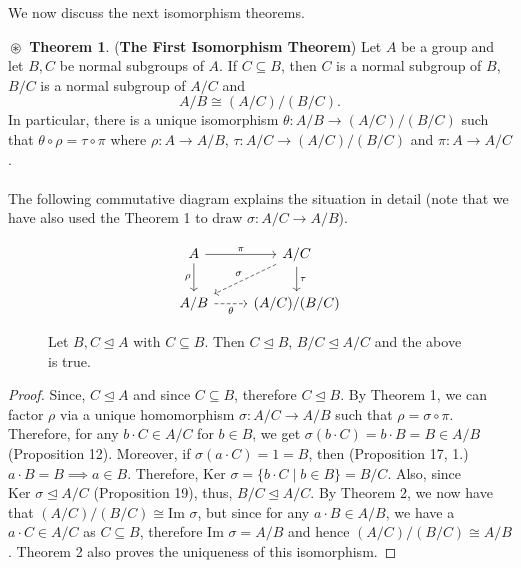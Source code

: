 \documentclass{article}
\theoremstyle{definition}
\newtheorem{theorem}{$\boxed{\boxed{\circledast}}$ Theorem}
\theoremstyle{remark}
\theoremstyle{definition}
\theoremstyle{definition}
\theoremstyle{definition}
\theoremstyle{proof}
\newcommand{\image}[0]{\text{Im }}
\newcommand{\kernel}[0]{\text{Ker }}
\newcommand{\nsg}[0]{\trianglelefteq}
\newcommand{\isomorph}{\cong}
\begin{document}
We now discuss the next isomorphism theorems.
\begin{theorem}
	(\textbf{The First Isomorphism Theorem}) Let $ A $ be a group and let $ B,C $ be normal subgroups of $ A $. If $ C\subseteq B $, then $ C $ is a normal subgroup of $ B $, $ B/C $ is a normal subgroup of $ A/C $ and
	\[A/B \isomorph (A/C)/(B/C).\]
	In particular, there is a unique isomorphism $ \theta : A/B \to (A/C)/(B/C) $ such that $ \theta \circ \rho = \tau \circ \pi $ where $ \rho : A \to A/B $, $ \tau : A/C \to (A/C)/(B/C) $ and $ \pi : A\to A/C $. \\\\
	The following commutative diagram explains the situation in detail (note that we have also used the Theorem 1 to draw $ \sigma : A/C \to A/B$).
	\begin{figure}[h!]
			\[\begin{tikzcd}
			A \arrow{r}{\pi} \arrow[swap]{d}{\rho}&A/C \arrow[swap,dashed]{dl}{\sigma} \arrow{d}{\tau}\\
			A/B \arrow[swap,dashed]{r}{\theta} &(A/C)/(B/C)
		\end{tikzcd}\]
	\caption{Let $ B,C \nsg A $ with $ C\subseteq B $. Then $ C\nsg B $, $ B/C \nsg A/C $ and the above is true.}
	\end{figure}
\end{theorem}
\begin{proof}
	Since, $ C\nsg A $ and since $ C \subseteq B $, therefore $ C\nsg B $. By Theorem 1, we can factor $ \rho $ via a unique homomorphism $ \sigma : A/C \to A/B$ such that $ \rho = \sigma \circ \pi $. Therefore, for any $ b\cdot C \in A/C $ for $ b\in B $, we get $ \sigma(b\cdot C) = b\cdot B =B \in A/B $ (Proposition 12). Moreover, if $ \sigma(a\cdot C) = 1 = B $, then (Proposition 17, 1.) $ a\cdot B = B\implies a\in B$. Therefore, $ \kernel \sigma = \{b\cdot C\;\vert\; b\in B\} = B/C$. Also, since $ \kernel \sigma \nsg A/C$ (Proposition 19), thus, $B/C \nsg A/C$. By Theorem 2, we now have that $ (A/C)/(B/C) \isomorph \image \sigma$, but since for any $ a\cdot B \in A/B$, we have a $ a\cdot C \in A/C $ as $ C\subseteq B $, therefore $ \image \sigma = A/B $ and hence $ (A/C)/(B/C) \isomorph A/B $. Theorem 2 also proves the uniqueness of this isomorphism.
\end{proof}
\hrulefill
\newpage
\end{document}

